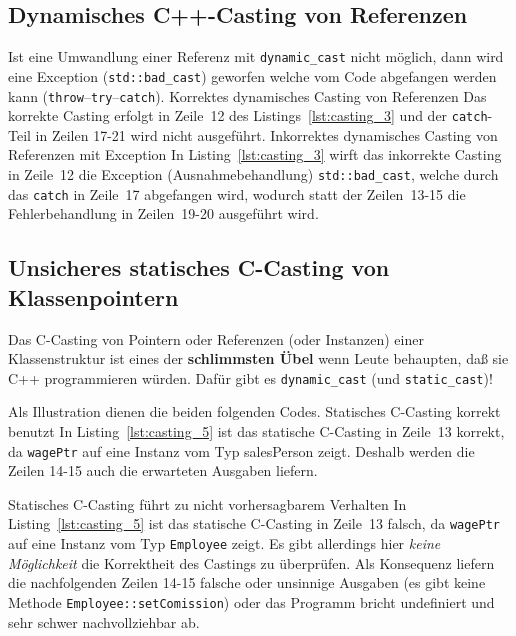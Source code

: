 \subsection{Dynamisches C++-Casting von Referenzen}
\label{sec:A4.2.2}
%
Ist eine Umwandlung einer Referenz mit \verb|dynamic_cast| nicht möglich, dann wird 
eine Exception (\verb|std::bad_cast|) geworfen welche vom Code abgefangen werden kann 
(\texttt{throw}--\texttt{try}--\texttt{catch}).
%
{Korrektes dynamisches Casting von Referenzen}
%
Das korrekte Casting erfolgt in Zeile~12 des Listings~\ref{lst:casting_3} 
und der \texttt{catch}-Teil in Zeilen 17-21 wird nicht ausgeführt.
%
%
{Inkorrektes dynamisches Casting von Referenzen mit Exception}
%
In Listing~\ref{lst:casting_3} wirft das inkorrekte Casting in Zeile~12 die 
Exception (Ausnahmebehandlung) \verb|std::bad_cast|,  welche durch das \texttt{catch} 
in Zeile~17 abgefangen wird, wodurch statt der Zeilen~13-15 die Fehlerbehandlung in Zeilen~19-20 
ausgeführt wird.
%
%
%
\subsection{Unsicheres statisches C-Casting von Klassenpointern}
\label{sec:A4.2.3}
%
Das C-Casting von Pointern oder Referenzen (oder Instanzen) einer Klassenstruktur 
ist eines der \textbf{schlimmsten Übel} wenn Leute behaupten, daß sie C++ programmieren würden. 
Dafür gibt es \verb|dynamic_cast| (und \verb|static_cast|)!

Als Illustration dienen die beiden folgenden Codes.
\pagebreak[4]
{Statisches C-Casting korrekt benutzt}
%
In Listing~\ref{lst:casting_5} ist das statische C-Casting in Zeile~13 korrekt, 
da \verb|wagePtr| auf eine Instanz vom Typ salesPerson zeigt.
Deshalb werden die Zeilen 14-15 auch die erwarteten Ausgaben liefern. 

{Statisches C-Casting führt zu nicht vorhersagbarem Verhalten}
%
In Listing~\ref{lst:casting_5} ist das statische C-Casting in Zeile~13 falsch, 
da  \verb|wagePtr| auf eine Instanz vom Typ \texttt{Employee} zeigt. 
Es gibt allerdings hier \emph{keine Möglichkeit} die Korrektheit des Castings zu überprüfen. 
Als Konsequenz liefern die nachfolgenden Zeilen 14-15 falsche oder unsinnige Ausgaben 
(es gibt keine Methode \verb|Employee::setComission|)  oder das Programm bricht undefiniert 
und sehr schwer nachvollziehbar ab.

